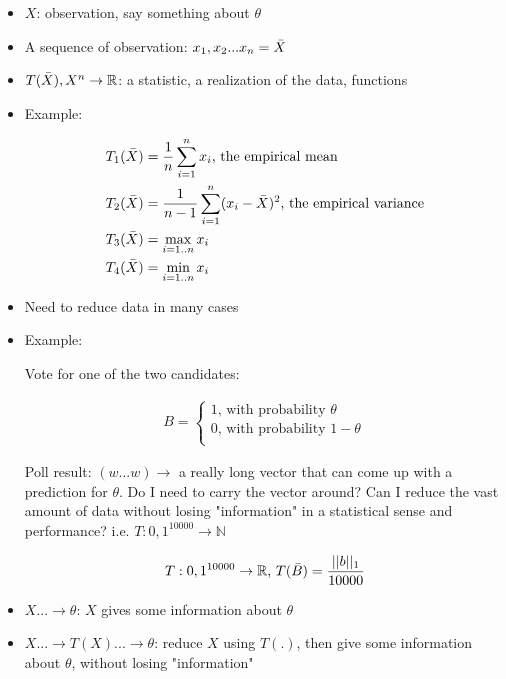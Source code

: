 \documentclass[11pt,letterpaper,titlepage]{article}
\begin{document}
\begin{itemize}
    
    \item $X$: observation, say something about $\theta$
    
    \item A sequence of observation: $x_1, x_2...x_n = \Bar{X}$
    
    \item $T(\Bar{X}), X^n \rightarrow \mathbb{R}$: a statistic, a realization of the data, functions
    
    \item Example:
    
    \begin{equation*}
        \begin{aligned}
            T_1(\Bar{X}) &= \frac{1}{n} \sum_{i = 1}^{n} x_i \text{, the empirical mean} \\
            T_2(\Bar{X}) &= \frac{1}{n - 1} \sum_{i = 1}^{n} (x_i - \Bar{X})^2 \text{, the empirical variance} \\
            T_3(\Bar{X}) &= \max_{i = 1..n} x_i \\
            T_4(\Bar{X}) &= \min_{i = 1..n} x_i
        \end{aligned}
    \end{equation*}
    
    \item Need to reduce data in many cases
    
    \item Example:
    
    Vote for one of the two candidates:
    
    \begin{gather*}
        B = 
        \begin{cases}
        1 \text{, with probability $\theta$} \\
        0\text{, with probability $1-\theta$} \\
        \end{cases}
    \end{gather*}
    
    Poll result: $(w...w) \rightarrow$ a really long vector that can come up with a prediction for $\theta$. Do I need to carry the vector around? Can I reduce the vast amount of data without losing "information" in a statistical sense and performance? i.e. $T: {0, 1}^10000 \rightarrow \mathbb{N}$
    
    \begin{equation*}
        T: {0, 1}^{10000} \rightarrow \mathbb{R} \text{, } T(\Bar{B}) = \frac{||b||_1}{10000}
    \end{equation*}
    
    \item $X...\rightarrow \theta$: $X$ gives some information about $\theta$
    
    \item $X...\rightarrow T(X) ... \rightarrow\theta$: reduce $X$ using $T(.)$, then give some information about $\theta$, without losing "information"
    
\end{itemize}
\end{document}
